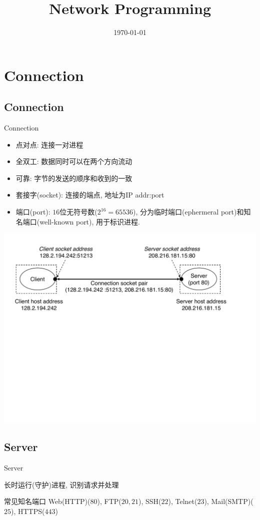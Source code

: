 \documentclass[]{beamer}
\title{Network Programming}
\author{}
\institute{北京大学}
\date{\today} %
\begin{document}
{ 
\frame{\titlepage}}


\section{Connection}
\subsection{Connection}
\begin{frame}{Connection}

	\begin{itemize}
		\item 点对点: 连接一对进程
		\item 全双工: 数据同时可以在两个方向流动
		\item 可靠: 字节的发送的顺序和收到的一致
		\item 套接字(socket): 连接的端点, 地址为IP addr:port
		\item 端口(port): $16$位无符号数($2^{16}=65536$), 分为临时端口(ephermeral port)和知名端口(well-known port), 用于标识进程.
	\end{itemize}
	
	 {\centering\includegraphics[width=0.8\linewidth]{figures/connection}}
	
\end{frame}

\subsection{Server}
\begin{frame}{Server}
	\begin{definition}
		长时运行(守护)进程, 识别请求并处理
	\end{definition}
	
	\begin{block}{常见知名端口}
		Web(HTTP)($80$), FTP($20, 21$), SSH($22$), Telnet($23$), Mail(SMTP)($25$), HTTPS($443$)
	\end{block}
\end{frame}
\end{document}
